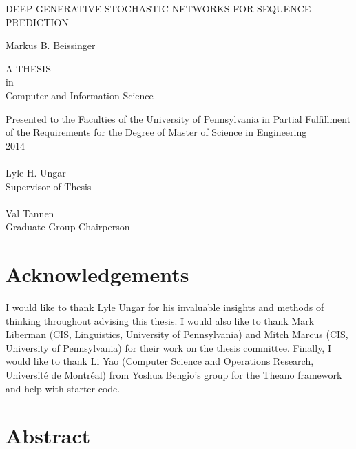 \documentclass[12pt, titlepage]{report}
\begin{document}
	\doublespacing
	
	\begin{titlepage}
		\begin{center}
			{\singlespacing \LARGE \uppercase{Deep Generative Stochastic Networks for Sequence Prediction}\\[12pt]}
			
			{\Large Markus B. Beissinger\\[12pt]}
			
			\uppercase{a thesis}\\[12pt]					
			in\\			
			{\Large Computer and Information Science\\[48pt]}
			
			Presented to the Faculties of the University of Pennsylvania in Partial Fulfillment of the Requirements for the Degree of Master of Science in Engineering\\[12pt]
			
			2014\\[36pt]
			
			\singlespacing
			\makebox[2.5in]{\hrulefill}\\
			Lyle H. Ungar\\
			Supervisor of Thesis\\[36pt]
			
			\makebox[2.5in]{\hrulefill}\\
			Val Tannen\\
			Graduate Group Chairperson
			
			\doublespacing
		\end{center}
	\end{titlepage}
	

	\chapter*{Acknowledgements}
	I would like to thank Lyle Ungar for his invaluable insights and methods of thinking throughout advising this thesis. I would also like to thank Mark Liberman (CIS, Linguistics, University of Pennsylvania) and Mitch Marcus (CIS, University of Pennsylvania) for their work on the thesis committee. Finally, I would like to thank Li Yao (Computer Science and Operations Research, Universit\'{e} de Montr\'{e}al) from Yoshua Bengio\rq{}s group for the Theano framework and help with starter code.
	
	\chapter*{Abstract}
	
	
\end{document}
